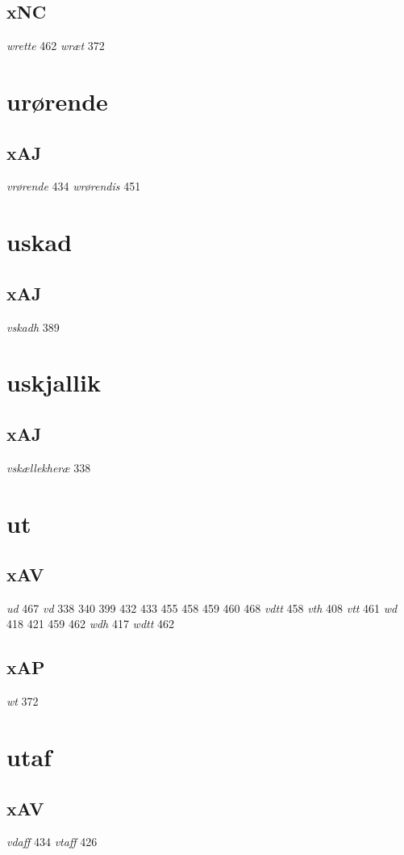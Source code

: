 \documentclass[a4paper,twocolumn]{article}
\begin{document}
\subsection{xNC}
\label{sec:org671f7b6}
\emph{wrette} 462 \emph{wræt} 372 
\section{urørende}
\label{sec:orga052ea1}
\subsection{xAJ}
\label{sec:org774d33e}
\emph{vrørende} 434 \emph{wrørendis} 451 
\section{uskad}
\label{sec:orgd9e9dd4}
\subsection{xAJ}
\label{sec:org133077f}
\emph{vskadh} 389 
\section{uskjallik}
\label{sec:orge667b3f}
\subsection{xAJ}
\label{sec:org8def822}
\emph{vskællekheræ} 338 
\section{ut}
\label{sec:org2168eef}
\subsection{xAV}
\label{sec:org9a7db06}
\emph{ud} 467 \emph{vd} 338 340 399 432 433 455 458 459 460 468 \emph{vdtt} 458 \emph{vth} 408 \emph{vtt} 461 \emph{wd} 418 421 459 462 \emph{wdh} 417 \emph{wdtt} 462 
\subsection{xAP}
\label{sec:org14510f2}
\emph{wt} 372 
\section{utaf}
\label{sec:orgf4cf2fc}
\subsection{xAV}
\label{sec:org1b0ab54}
\emph{vdaff} 434 \emph{vtaff} 426 
\end{document}
